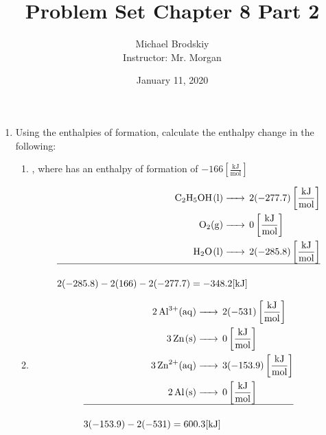 \documentclass[12pt]{article}
\title{Problem Set Chapter 8 Part 2}
\date{January 11, 2020}
\author{Michael Brodskiy\\ \small Instructor: Mr. Morgan}
\begin{document}
\maketitle

\begin{enumerate}

  \item Using the enthalpies of formation, calculate the enthalpy change in the following:

    \begin{enumerate}

      \item {}, where  has an enthalpy of formation of $-166\left[ \frac{\si{\kilo\joule}}{\si{\mole}} \right]$

        \begin{equation}
          \begin{split}
            \ce{C2H5OH(l) ->}&\,2(-277.7)\left[ \frac{\si{\kilo\joule}}{\si{\mole}} \right]\\
            \ce{O2(g) ->}&\,0\left[ \frac{\si{\kilo\joule}}{\si{\mole}} \right]\\
            \ce{H2O(l) ->}&\,2(-285.8)\left[ \frac{\si{\kilo\joule}}{\si{\mole}} \right]\\
            \hline\\
            2(-285.8)-2(166)-2(-277.7)=-348.2[\si{\kilo\joule}]\\
          \end{split}
          \label{1}
        \end{equation}

      \item {}

        \begin{equation}
          \begin{split}
            \ce{2Al^3+(aq) ->}&\,2(-531)\left[ \frac{\si{\kilo\joule}}{\si{\mole}} \right]\\
            \ce{3Zn(s) ->}&\,0\left[ \frac{\si{\kilo\joule}}{\si{\mole}} \right]\\
          \ce{3Zn^2+(aq) ->}&\,3(-153.9)\left[ \frac{\si{\kilo\joule}}{\si{\mole}} \right]\\
            \ce{2Al(s) ->}&\,0\left[ \frac{\si{\kilo\joule}}{\si{\mole}} \right]\\
            \hline\\
            3(-153.9)-2(-531)=600.3[\si{\kilo\joule}]\\
          \end{split}
          \label{2}
        \end{equation}


\end{enumerate}
\end{enumerate}
\end{document}
